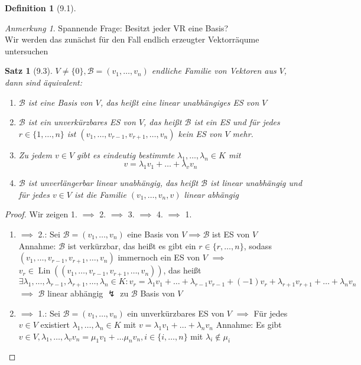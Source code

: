 \documentclass[a4paper]{scrartcl}
\DeclareMathOperator{\Exists}{\exists}
\DeclareMathOperator{\Lin}{Lin}
\theoremstyle{definition}
\newtheorem{defn}{Definition}
\theoremstyle{plain}
\newtheorem{thm}{Satz}
\theoremstyle{plain}
\theoremstyle{remark}
\theoremstyle{remark}
\newtheorem{note}{Anmerkung}
\theoremstyle{remark}
\theoremstyle{remark}
\theoremstyle{remark}
\begin{document}
\begin{defn}[9.1]
\begin{note}
  Spannende Frage: Besitzt jeder VR eine Basis? \\
  Wir werden das zunächst für den Fall endlich erzeugter Vektorräqume untersuchen
\end{note}
\begin{thm}[9.3]
$V \neq \{0\}, \mathcal{B} = (v_1, \ldots, v_n)$ endliche Familie von Vektoren aus $V$, dann sind äquivalent:
\begin{enumerate}
\item $\mathcal{B}$ ist eine Basis von $V$, das heißt eine linear unabhängiges ES von $V$
\item $\mathcal{B}$ ist ein unverkürzbares ES von $V$, das heißt $\mathcal{B}$ ist ein ES und für jedes $r\in\{1,\ldots,n\}$ ist $(v_1, \ldots, v_{r - 1}, v_{r + 1}, \ldots, v_n)$ kein ES von $V$ mehr.
\item Zu jedem $v\in V$ gibt es eindeutig bestimmte $\lambda_1, \ldots, \lambda_n \in K$ mit
\[v = \lambda_1 v_1 + \ldots + \lambda_v v_n\]
\item $\mathcal{B}$ ist unverlängerbar linear unabhängig, das heißt $\mathcal{B}$ ist linear unabhängig und für jedes $v\in V$ ist die Familie $(v_1, \ldots, v_n, v)$ linear abhängig
\end{enumerate}
\end{thm}
\begin{proof}
Wir zeigen 1. $\implies$ 2. $\implies$ 3. $\implies$ 4. $\implies$ 1. \\
\begin{enumerate}
\item $\implies$ 2.: Sei $\mathcal{B} = (v_1, \ldots, v_n)$ eine Basis von $V \implies \mathcal{B}$ ist ES von $V$ \\
     Annahme: $\mathcal{B}$ ist verkürzbar, das heißt es gibt ein $r\in\{r, \ldots, n\}$, sodass $(v_1, \ldots, v_{r - 1}, v_{r + 1}, \ldots, v_n)$ immernoch ein ES von $V$
$\implies$ $v_r \in \Lin((v_1, \ldots, v_{r - 1}, v_{r + 1}, \ldots, v_n))$, das heißt
\[\Exists \lambda_1, \ldots, \lambda_{r - 1}, \lambda_{r + 1}, \ldots, \lambda_n\in K: v_r = \lambda_1 v_1 + \ldots + \lambda_{r - 1} v_{r - 1} + (-1)v_r + \lambda_{r + 1} v_{r + 1} + \ldots + \lambda_n v_n\]
$\implies$ $\mathcal{B}$ linear abhängig $\lightning$ zu $\mathcal{B}$ Basis von $V$
\item $\implies$ 1.: Sei $\mathcal{B} = (v_1, \ldots, v_n)$ ein unverkürzbares ES von $V$ $\implies$ Für jedes $v\in V$ existiert $\lambda_1, \ldots, \lambda_n \in K$ mit $v = \lambda_1 v_1 + \ldots + \lambda_n v_n$
     Annahme: Es gibt $v\in V, \lambda_1, \ldots, \lambda_v v_n = \mu_1 v_1 + \ldots \mu_n v_n, i \in \{i, \ldots, n\}$ mit $\lambda_i \not \in \mu_i$

\end{enumerate}
\end{proof}
\end{defn}
\end{document}
